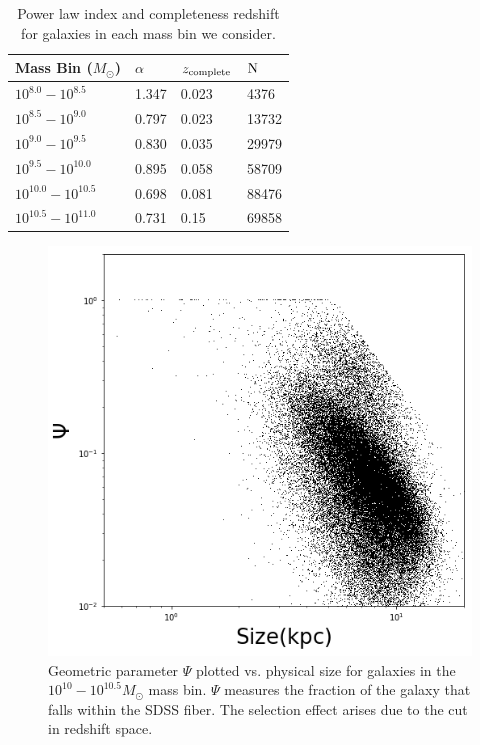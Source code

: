 \documentclass[iop]{emulateapj}
\begin{document}
\begin{table}[]
	\centering

	\label{tab:infotab}
	\begin{tabular}{llll} 
	\hline 
	Mass Bin ($M_{\odot}$)& $\alpha$ & $z_{\rm complete}$ 	&  $\rm N$ \\
	\hline
	\hline 
	$10^{8.0} - 10^{8.5}$   & 1.347 & 0.023 & 4376 \\ 
	$10^{8.5} - 10^{9.0}$   & 0.797 & 0.023 & 13732\\
	$10^{9.0} - 10^{9.5}$   & 0.830  & 0.035  & 29979 \\ 
	$10^{9.5} - 10^{10.0}$   & 0.895    & 0.058 & 58709 \\
	$10^{10.0} - 10^{10.5}$   &  0.698 & 0.081 & 88476 \\
	$10^{10.5} - 10^{11.0}$   &  0.731 & 0.15 & 69858 \\
	\hline 
	\end{tabular}
		\caption{Power law index and completeness redshift for galaxies in each mass bin we consider. }
\end{table}


\begin{figure}
	\centering
	\includegraphics[width=1 \columnwidth]{geometry_9_5.png}
	\caption{Geometric parameter $\Psi$ plotted vs. physical size for galaxies in the $10^{10} - 10^{10.5} M_{\odot}$ mass bin. $\Psi$ measures the fraction of the galaxy that falls within the SDSS fiber. The selection effect arises due to the cut in redshift space.}
     \label{fig:geo}

\end{figure}
\end{document}
